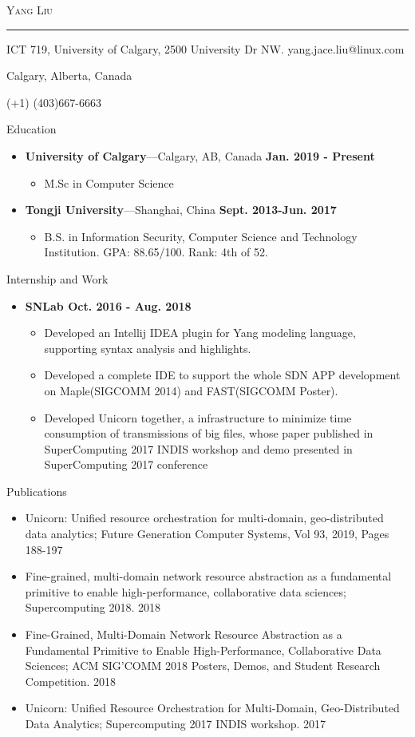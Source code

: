 \documentclass[10pt,oneside]{article}
\newcommand{\bigname}[1]{
	\begin{center}\fontfamily{phv}\selectfont\Huge\scshape#1\end{center}
}
\newenvironment{ressection}[1]{
	\vspace{4pt}
	{\fontfamily{phv}\selectfont\Large#1}
	\begin{itemize}
	\vspace{3pt}
}{
	\end{itemize}
}
\newcommand{\resitem}[1]{
	\vspace{-4pt}
	\item \begin{flushleft} #1 \end{flushleft}
}
\newcommand{\ressubitem}[1]{
	\vspace{-1pt}
	\item \begin{flushleft} #1 \end{flushleft}
}
\newcommand{\resbigitem}[3]{
	\vspace{-5pt}
	\item
	\textbf{#1}---#2 \
	\textit{#3}
}
\newenvironment{ressubsec}[3]{
	\resbigitem{#1}{#2}{#3}
	\vspace{-2pt}
	\begin{itemize}
}{
	\end{itemize}
}
\newenvironment{reslist}[1]{
	\resitem{\textbf{#1}}
	\vspace{-5pt}
	\begin{itemize}
}{
	\end{itemize}
}
\begin{document}
 \selectfont

\bigname{Yang Liu}

\vspace{-8pt} \rule{\textwidth}{1pt}

\vspace{-1pt} {ICT 719, University of Calgary, 2500 University Dr NW. \hfill yang.jace.liu@linux.com}

\vspace{-1pt} {Calgary, Alberta, Canada}

\vspace{-1pt} {(+1) (403)667-6663}

\vspace{8 pt}

\newcommand{\textsharp}{$\sharp$}

\begin{ressection}{Education}
	\begin{ressubsec}{University of Calgary}{Calgary, AB, Canada \hfill \textbf{Jan. 2019 - Present}}{}
		\ressubitem{M.Sc in Computer Science}
	\end{ressubsec}
	\begin{ressubsec}{Tongji University}{Shanghai, China \hfill \textbf{Sept. 2013-Jun. 2017}}{}
		\ressubitem{B.S. in Information Security, Computer Science and Technology Institution. GPA: 88.65/100. Rank: 4th of 52. }
	\end{ressubsec}
\end{ressection}


\begin{ressection}{Internship and Work}
	\begin{reslist}{SNLab \hfill Oct. 2016 - Aug. 2018}
		\ressubitem{Developed an Intellij IDEA plugin for Yang modeling language, supporting syntax analysis and highlights.}
        \ressubitem{Developed a complete IDE to support the whole SDN APP development on Maple(SIGCOMM 2014) and FAST(SIGCOMM Poster).}
		\ressubitem{Developed Unicorn together, a infrastructure to minimize time consumption of transmissions of big files, whose paper published in SuperComputing 2017 INDIS workshop and demo presented in SuperComputing 2017 conference}
	\end{reslist}
\end{ressection}

\begin{ressection}{Publications}
	\ressubitem{Unicorn: Unified resource orchestration for multi-domain, geo-distributed data analytics; Future Generation Computer Systems, Vol 93, 2019, Pages 188-197}
	\ressubitem{Fine-grained, multi-domain network resource abstraction as a fundamental primitive to enable high-performance, collaborative data sciences; Supercomputing 2018. 2018}
	\ressubitem{Fine-Grained, Multi-Domain Network Resource Abstraction as a Fundamental Primitive to Enable High-Performance, Collaborative Data Sciences; ACM SIG’COMM 2018 Posters, Demos, and Student Research Competition. 2018}
	\ressubitem{Unicorn: Unified Resource Orchestration for Multi-Domain, Geo-Distributed Data Analytics; Supercomputing 2017 INDIS workshop. 2017}
\end{ressection}
	
\end{document}
